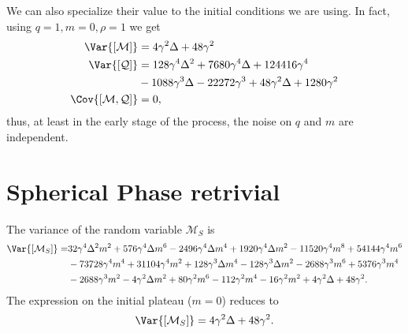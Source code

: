 We can also specialize their value to the initial conditions we are using.
In fact, using \(q=1, m=0, \rho=1\) we get
\[\begin{split}
  \Var{[\mathcal{M}]} &= 4 \gamma ^2 \Delta +48 \gamma ^2 \\
  \Var{[\mathcal{Q}]} &= 128 \gamma ^4 \Delta ^2+7680 \gamma ^4 \Delta +124416 \gamma ^4 \\
                      &-1088 \gamma ^3 \Delta -22272 \gamma ^3+48 \gamma ^2 \Delta +1280 \gamma ^2 \\
  \Cov{[\mathcal{M},\mathcal{Q}]} &= 0,
\end{split}\]
thus, at least in the early stage of the process, the noise on \(q\) and \(m\) are independent.

\section{Spherical Phase retrivial}
The variance of the random variable \(\mathcal{M}_S\) is
\[\begin{split}
  \Var{[\mathcal{M}_S]} =& 32 \gamma ^4 \Delta ^2 m^2+576 \gamma ^4 \Delta  m^6-2496 \gamma ^4 \Delta  m^4
                         +1920 \gamma ^4 \Delta  m^2-11520 \gamma ^4 m^8+54144 \gamma ^4 m^6\\
                         &-73728 \gamma ^4 m^4+31104 \gamma ^4 m^2+128 \gamma ^3 \Delta  m^4
                         -128 \gamma ^3 \Delta  m^2-2688 \gamma ^3 m^6+5376 \gamma ^3 m^4\\
                         &-2688 \gamma ^3 m^2-4 \gamma ^2 \Delta  m^2+80 \gamma ^2 m^6-112 \gamma ^2 m^4
                         -16 \gamma ^2 m^2+4 \gamma ^2 \Delta +48 \gamma ^2.
\end{split}\]
The expression on the initial plateau (\(m=0\)) reduces to
\[
  \Var{[\mathcal{M}_S]} = 4 \gamma ^2 \Delta +48 \gamma ^2.
\]